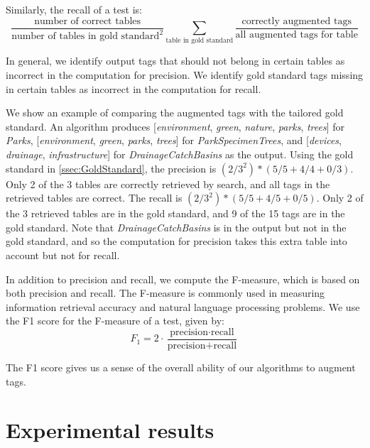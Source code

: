 Similarly, the recall of a test is:
\[
\frac{\text{number of correct tables}}{\text{number of tables in gold standard}^{2}}\sum\limits _{\text{table in gold standard}}\frac{\text{correctly augmented tags}}{\text{all augmented tags for table}}
\]

In general, we identify output tags that should not belong in certain tables as incorrect in the computation for precision. We identify gold standard tags missing in certain tables as incorrect in the computation for recall.

We show an example of comparing the augmented tags with the tailored gold standard. An algorithm produces [\textit{environment}, \textit{green}, \textit{nature}, \textit{parks}, \textit{trees}] for \textit{Parks}, [\textit{environment}, \textit{green}, \textit{parks}, \textit{trees}] for \textit{ParkSpecimenTrees}, and [\textit{devices}, \textit{drainage}, \textit{infrastructure}] for \textit{DrainageCatchBasins} as the output. Using the gold standard in \autoref{ssec:GoldStandard}, the precision is $(2/3^{2})*(5/5+4/4+0/3)$. Only 2 of the 3 tables are correctly retrieved by search, and all tags in the retrieved tables are correct. The recall is $(2/3^{2})*(5/5 + 4/5 + 0/5)$. Only 2 of the 3 retrieved tables are in the gold standard, and 9 of the 15 tags are in the gold standard. Note that \textit{DrainageCatchBasins} is in the output but not in the gold standard, and so the computation for precision takes this extra table into account but not for recall.

In addition to precision and recall, we compute the F-measure, which is based on both precision and recall. The F-measure is commonly used in measuring information retrieval accuracy and natural language processing problems. We use the F1 score for the F-measure of a test, given by:
\[
\ensuremath{F_{1}}=2\ensuremath{\cdot}\frac{\text{precision}\cdot\text{recall}}{\text{precision}+\text{recall}}
\]

The F1 score gives us a sense of the overall ability of our algorithms to augment tags.

\section{Experimental results}
\label{sec:ExperimentalResults}


